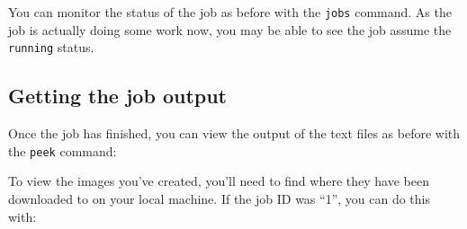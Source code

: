 You can monitor the status of the job as before with the \texttt{jobs}
command. As the job is actually doing some work now, you may be able to
see the job assume the \texttt{running} status.

\subsection{Getting the job output}
\label{getting-the-job-output}
Once the job has finished, you can view the output of the text files as
before with the \texttt{peek} command:

\begin{Shaded}
\begin{Highlighting}[]
 
 \NormalTok{)}
\end{Highlighting}
\end{Shaded}

To view the images you've created, you'll need to find where they have
been downloaded to on your local machine. If the job ID was ``1'', you
can do this with:

\begin{Shaded}
\begin{Highlighting}[]
 
 
 
\end{Highlighting}
\end{Shaded}

\begin{Shaded}
\begin{Highlighting}[]
\NormalTok{$ } 
\NormalTok{$ } 
\NormalTok{$ } 
\NormalTok{[}\NormalTok{]}
\end{Highlighting}
\end{Shaded}

